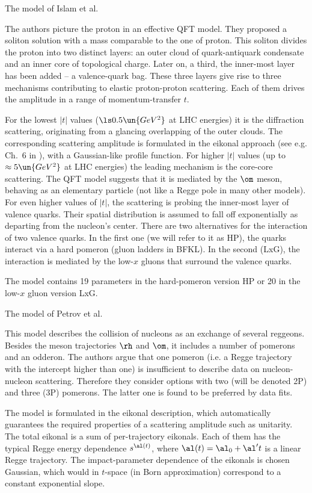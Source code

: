 \caption{The model of Islam et al. }

The authors picture the proton in an effective QFT model. They proposed a soliton solution with a mass comparable to the one of proton. This soliton divides the proton into two distinct layers: an outer cloud of quark-antiquark condensate and an inner core of topological charge. Later on, a third, the inner-most layer has been added -- a valence-quark bag. These three layers give rise to three mechanisms contributing to elastic proton-proton scattering. Each of them drives the amplitude in a range of momentum-transfer $t$.

For the lowest $|t|$ values ($\ls 0.5\un{GeV^2}$ at LHC energies) it is the diffraction scattering, originating from a glancing overlapping of the outer clouds. The corresponding scattering amplitude is formulated in the eikonal approach (see e.g. Ch.~6 in ), with a Gaussian-like profile function. For higher $|t|$ values (up to $\approx 5\un{GeV^2}$ at LHC energies) the leading mechanism is the core-core scattering. The QFT model suggests that it is mediated by the $\rm\om$ meson, behaving as an elementary particle (not like a Regge pole in many other models). For even higher values of $|t|$, the scattering is probing the inner-most layer of valence quarks. Their spatial distribution is assumed to fall off exponentially as departing from the nucleon's center. There are two alternatives for the interaction of two valence quarks. In the first one (we will refer to it as HP), the quarks interact via a hard pomeron (gluon ladders in BFKL). In the second (LxG), the interaction is mediated by the low-$x$ gluons that surround the valence quarks.

The model contains 19 parameters in the hard-pomeron version HP or 20 in the low-$x$ gluon version LxG.

\caption{The model of Petrov et al. }

This model describes the collision of nucleons as an exchange of several reggeons. Besides the meson trajectories $\rm\rh$ and $\rm\om$, it includes a number of pomerons and an odderon. The authors argue that one pomeron (i.e. a Regge trajectory with the intercept higher than one) is insufficient to describe data on nucleon-nucleon scattering. Therefore they consider options with two (will be denoted 2P) and three (3P) pomerons. The latter one is found to be preferred by data fits.

The model is formulated in the eikonal description, which automatically guarantees the required properties of a scattering amplitude such as unitarity. The total eikonal is a sum of per-trajectory eikonals. Each of them has the typical Regge energy dependence $s^{\al(t)}$, where $\al(t) = \al_0 + \al' t$ is a linear Regge trajectory. The impact-parameter dependence of the eikonals is chosen Gaussian, which would in $t$-space (in Born approximation) correspond to a constant exponential slope.


